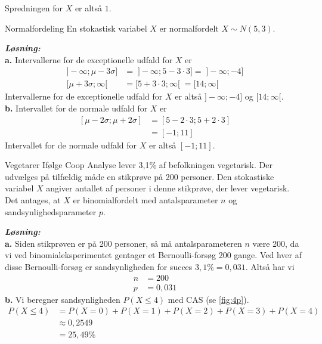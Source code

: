 \documentclass{article}
\newcommand{\sol}{\setlength{\parindent}{0cm}\textbf{\textit{Løsning:}}\setlength{\parindent}{1cm}}
\begin{document}
Spredningen for $X$ er altså $1$. 
\begin{question}{Normalfordeling}{}
  En stokastisk variabel $X$ er normalfordelt $X \sim N(5,3)$.
\end{question}
\sol \\
\textbf{a.}
Intervallerne for de exceptionelle udfald for $X$ er
\begin{equation*}
\begin{split}
  ]-\infty;\mu -3 \sigma ] &= \;]-\infty;5 -3 \cdot 3] = \;]-\infty;-4]\\
  [\mu + 3 \sigma; \infty[\;&=[5 + 3 \cdot 3; \infty[\;=[14; \infty[
\end{split}
\end{equation*}
Intervallerne for de exceptionelle udfald for $X$ er altså $]-\infty;-4]$ og $[14; \infty[$. \\[1ex]
\textbf{b.}
Intervallet for de normale udfald for $X$ er 
\begin{equation*}
\begin{split}
  [\mu - 2 \sigma ; \mu + 2 \sigma ]&=[5 - 2 \cdot 3 ; 5 + 2 \cdot 3]\\
  &=[-1;11]
\end{split}
\end{equation*}
Intervallet for de normale udfald for $X$ er altså $[-1;11]$.
\begin{question}{Vegetarer}{}
  Ifølge Coop Analyse lever 3,1\% af befolkningen vegetarisk. 
  Der udvælges på tilfældig måde en stikprøve på 200 personer. 
  Den stokastiske variabel $X$ angiver antallet af personer i denne stikprøve, der lever vegetarisk.
  Det antages, at $X$ er binomialfordelt med antalsparameter $n$ og sandsynlighedsparameter $p.$
\end{question}
\sol \\
\textbf{a.}
Siden stikprøven er på 200 personer, så må antalsparameteren $n$ være 200, da vi ved binomialeksperimentet gentager et Bernoulli-forsøg 200 gange. 
Ved hver af disse Bernoulli-forsøg er sandsynligheden for succes $3,1 \%=0,031$.
Altså har vi 
\begin{equation*}
\begin{split}
  n&=200\\
  p&=0,031
\end{split}
\end{equation*}
\textbf{b.}
Vi beregner sandsynligheden $P(X \leq 4)$ med CAS (se \cref{fig:4p}).
\begin{equation*}
\begin{split}
  P(X \leq 4)&=P(X=0)+P(X=1)+P(X=2)+P(X=3)+P(X=4)\\
  &\approx 0,2549 \\
  &=25,49 \%
\end{split}
\end{equation*}
\end{document}
